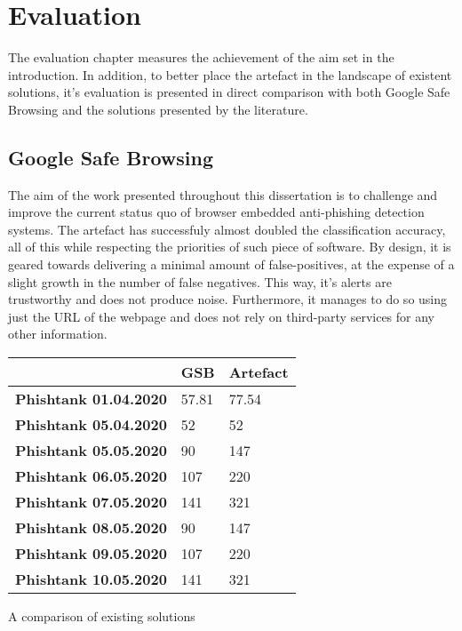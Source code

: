 \chapter{Evaluation}
The evaluation chapter measures the achievement of the aim set in the introduction. In addition, to better place the artefact in the landscape of existent solutions, it's evaluation is presented in direct comparison with both Google Safe Browsing and the solutions presented by the literature.

\section{Google Safe Browsing}
The aim of the work presented throughout this dissertation is to challenge and improve the current status quo of browser embedded anti-phishing detection systems. The artefact has successfuly almost doubled the classification accuracy, all of this while respecting the priorities of such piece of software. By design, it is geared towards delivering a minimal amount of false-positives, at the expense of a slight growth in the number of false negatives. This way, it's alerts are trustworthy and does not produce noise. Furthermore, it manages to do so using just the URL of the webpage and does not rely on third-party services for any other information.

\begin{singlespace}
    \small
    \begin{center}
        \label{tab:ARTEFACT_VS_GSB}
        \begin{tabular}{ | m{14em} | m{5em} | m{5em} |}
            \hline
                                          & \textbf{GSB} & \textbf{Artefact} \\
            \hline
            \textbf{Phishtank 01.04.2020} & 57.81        & 77.54             \\
            \hline
            \textbf{Phishtank 05.04.2020} & 52           & 52                \\
            \hline\hline
            \textbf{Phishtank 05.05.2020} & 90           & 147               \\
            \hline
            \textbf{Phishtank 06.05.2020} & 107          & 220               \\
            \hline
            \textbf{Phishtank 07.05.2020} & 141          & 321               \\
            \hline
            \textbf{Phishtank 08.05.2020} & 90           & 147               \\
            \hline
            \textbf{Phishtank 09.05.2020} & 107          & 220               \\
            \hline
            \textbf{Phishtank 10.05.2020} & 141          & 321               \\
            \hline
        \end{tabular}
        \captionsetup{type=table}\caption{A comparison of existing solutions \citep{INTELLIGENT_PHISHING_ANFIS}}
    \end{center}
\end{singlespace}

